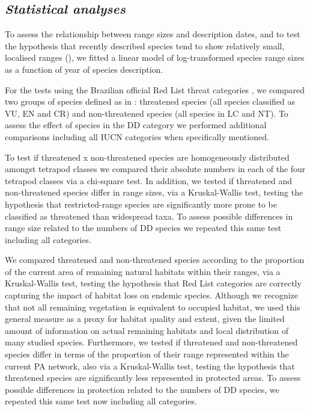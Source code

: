 \documentclass[12pt,openright,oneside,a4paper,english]{abntex2}
\begin{document}
\subsection{\textit{Statistical analyses}}	

To assess the relationship between range sizes and description dates, and to test the hypothesis that recently described species tend to show relatively small, localised ranges (\citealp[see][]{Gaston1996}), we fitted a linear model of log-transformed species range sizes as a function of year of species description.

For the tests using the Brazilian official Red List threat categories \citep{ICMBio2023}, we compared two groups of species defined as in \citet{Borgelt2022}: threatened species (all species classified as VU, EN and CR) and non-threatened species (all species in LC and NT). To assess the effect of species in the DD category we performed additional comparisons including all IUCN categories when specifically mentioned.

To test if threatened x non-threatened species \citep{Borgelt2022} are homogeneously distributed amongst tetrapod classes we compared their absolute numbers in each of the four tetrapod classes via a chi-square test. In addition, we tested if threatened and non-threatened species differ in range sizes, via a Kruskal-Wallis test, testing the hypothesis that restricted-range species are significantly more prone to be classified as threatened than widespread taxa. To assess possible differences in range size related to the numbers of DD species we repeated this same test including all categories.

We compared threatened and non-threatened species according to the proportion of the current area of remaining natural habitats within their ranges, via a Kruskal-Wallis test, testing the hypothesis that Red List categories are correctly capturing the impact of habitat loss on endemic species. Although we recognize that not all remaining vegetation is equivalent to occupied habitat, we used this general measure as a proxy for habitat quality and extent, given the limited amount of information on actual remaining habitats and local distribution of many studied species. Furthermore, we tested if threatened and non-threatened species differ in terms of the proportion of their range represented within the current PA network, also via a Kruskal-Wallis test, testing the hypothesis that threatened species are significantly less represented in protected areas. To assess possible differences in protection related to the numbers of DD species, we repeated this same test now including all categories.
\end{document}

